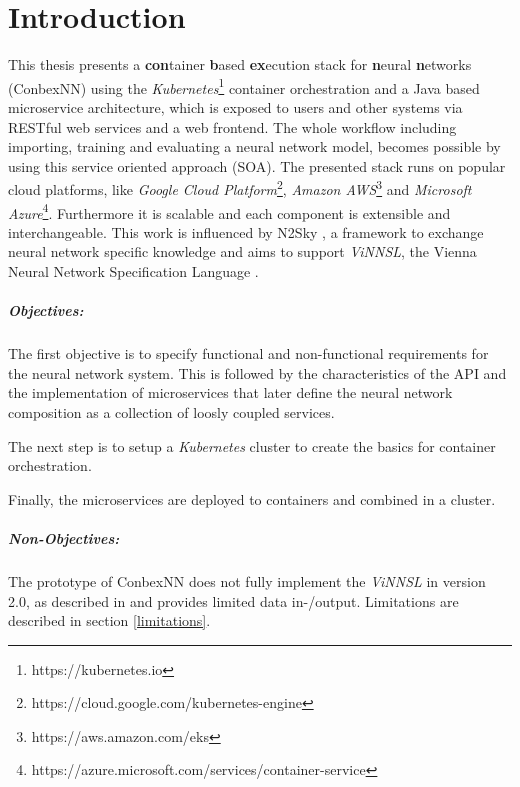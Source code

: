 \chapter{Introduction}\label{introduction}

This thesis presents a \textbf{con}tainer \textbf{b}ased
\textbf{ex}ecution stack for \textbf{n}eural \textbf{n}etworks
(ConbexNN) using the \emph{Kubernetes}\footnote{https://kubernetes.io}
container orchestration and a Java based microservice architecture,
which is exposed to users and other systems via RESTful web services and
a web frontend. The whole workflow including importing, training and
evaluating a neural network model, becomes possible by using this
service oriented approach (SOA). The presented stack runs on popular
cloud platforms, like \emph{Google Cloud Platform}\footnote{https://cloud.google.com/kubernetes-engine},
\emph{Amazon AWS}\footnote{https://aws.amazon.com/eks} and
\emph{Microsoft Azure}\footnote{https://azure.microsoft.com/services/container-service}.
Furthermore it is scalable and each component is extensible and
interchangeable. This work is influenced by N2Sky \cite{schikuta_2013},
a framework to exchange neural network specific knowledge and aims to
support \emph{ViNNSL}, the Vienna Neural Network Specification Language
\cite{kopica_2015} \cite{beran_2008}.

\paragraph{Objectives:}\label{objectives}

The first objective is to specify functional and non-functional
requirements for the neural network system. This is followed by the
characteristics of the API and the implementation of microservices that
later define the neural network composition as a collection of loosly
coupled services.

The next step is to setup a \emph{Kubernetes} cluster to create the
basics for container orchestration.

Finally, the microservices are deployed to containers and combined in a
cluster.

\paragraph{Non-Objectives:}\label{non-objectives}

The prototype of ConbexNN does not fully implement the \emph{ViNNSL} in
version 2.0, as described in \cite{kopica_2015} and provides limited
data in-/output. Limitations are described in section \ref{limitations}.


